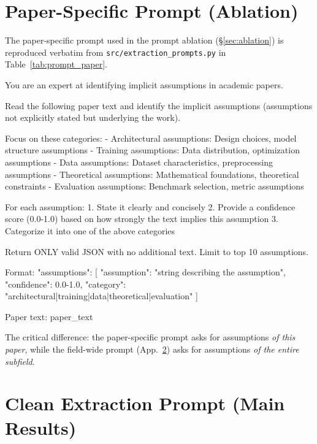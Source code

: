 \documentclass[11pt]{article}
\newcommand{\fpath}[1]{\mbox{}\nolinkurl{#1}}
\begin{document}
\section{Paper-Specific Prompt (Ablation)}\label{app:paper_prompt}

The paper-specific prompt used in the prompt ablation (\S\ref{sec:ablation}) is reproduced verbatim from \fpath{src/extraction_prompts.py} in Table~\ref{tab:prompt_paper}.

\begin{table}[!tb]
\caption{Paper-specific prompt used in the prompt ablation (App.~\ref{app:paper_prompt}), verbatim.}
\label{tab:prompt_paper}
\begin{promptbox}
You are an expert at identifying implicit assumptions in academic papers.

Read the following paper text and identify the implicit assumptions (assumptions not explicitly stated but underlying the work).

Focus on these categories:
- Architectural assumptions: Design choices, model structure assumptions
- Training assumptions: Data distribution, optimization assumptions
- Data assumptions: Dataset characteristics, preprocessing assumptions
- Theoretical assumptions: Mathematical foundations, theoretical constraints
- Evaluation assumptions: Benchmark selection, metric assumptions

For each assumption:
1. State it clearly and concisely
2. Provide a confidence score (0.0-1.0) based on how strongly the text implies this assumption
3. Categorize it into one of the above categories

Return ONLY valid JSON with no additional text. Limit to top 10 assumptions.

Format:
{
  "assumptions": [
    {
      "assumption": "string describing the assumption",
      "confidence": 0.0-1.0,
      "category": "architectural|training|data|theoretical|evaluation"
    }
  ]
}

Paper text:
{paper_text}
\end{promptbox}
\end{table}



The critical difference: the paper-specific prompt asks for assumptions \emph{of this paper}, while the field-wide prompt (App.~\ref{app:prompt}) asks for assumptions \emph{of the entire subfield}.

\section{Clean Extraction Prompt (Main Results)}\label{app:prompt}
\end{document}
